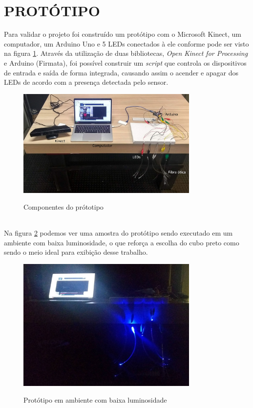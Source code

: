 \section{PROTÓTIPO}

Para validar o projeto foi construído um protótipo com o Microsoft Kinect, um computador, um Arduino Uno e 5 LEDs conectados à ele conforme pode ser visto na figura \ref{fig:prototipo}. Através da utilização de duas bibliotecas, \textit{Open Kinect for Processing} e Arduino (Firmata), foi possível construir um \textit{script} que controla os dispositivos de entrada e saída de forma integrada, causando assim o acender e apagar dos LEDs de acordo com a presença detectada pelo sensor.

\begin{figure}[H]
    \centering
    \caption{Componentes do prótotipo}
	\vspace*{0,2cm}
    \includegraphics[width=0.8\textwidth]{./04-figuras/prototipo}
    \label{fig:prototipo}
\end{figure}
\vspace*{-0,9cm}
{\raggedright {}}\\

Na figura \ref{fig:prototipo-escuro} podemos ver uma amostra do protótipo sendo executado em um ambiente com baixa luminosidade, o que reforça a escolha do cubo preto como sendo o meio ideal para exibição desse trabalho.
 
\begin{figure}[H]
    \centering
    \caption{Protótipo em ambiente com baixa luminosidade}
	\vspace*{0,2cm}
    \includegraphics[width=0.8\textwidth]{./04-figuras/prototipo_escuro}
    \label{fig:prototipo-escuro}
\end{figure}
\vspace*{-0,9cm}
{\raggedright {}}\\

   